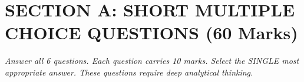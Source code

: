 \documentclass[12pt,a4paper]{article}
\begin{document}
\section*{SECTION A: SHORT MULTIPLE CHOICE QUESTIONS (60 Marks)}

{\large\itshape Answer all 6 questions. Each question carries 10 marks. 
Select the SINGLE most appropriate answer. These questions require deep analytical thinking.}

\vspace{0.5cm}

\end{document}
